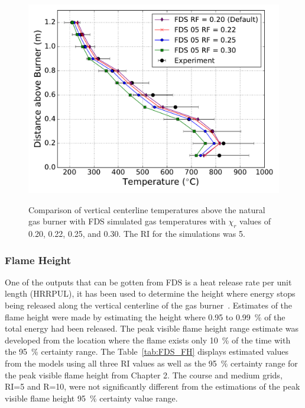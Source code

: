 \documentclass[twoside]{uocthesis}
\begin{document}
{\begin{figure}
	\includegraphics[width=5in]{../Figures/FHNG01_RF_RI5} \\
	\caption[Comparison of vertical centerline temperatures above the natural gas burner with FDS simulated gas temperatures based on varied $\chi_r$.]{Comparison of vertical centerline temperatures above the natural gas burner with FDS simulated gas temperatures with $\chi_r$ values of 0.20, 0.22, 0.25, and 0.30.  The RI for the simulations was 5.}
	\label{FHNG01_RF_RI5}
\end{figure}

\subsubsection{Flame Height}

One of the outputs that can be gotten from FDS is a heat release rate per unit length (HRRPUL), it has been used to determine the height where energy stops being released along the vertical centerline of the gas burner~\cite{McDermott:2011}.  Estimates of the flame height were made by estimating the height where 0.95 to 0.99~$\%$ of the total energy had been released. The peak visible flame height range estimate was developed from the location where the flame exists only 10~\% of the time with the 95~\% certainty range.  The Table~\ref{tab:FDS_FH} displays estimated values from the models using all three RI values as well as the 95~$\%$ certainty range for the peak visible flame height from Chapter 2.  The course and medium grids, RI=5 and R=10, were not significantly different from the estimations of the peak visible flame height 95~$\%$ certainty value range.     

}
\end{document}
